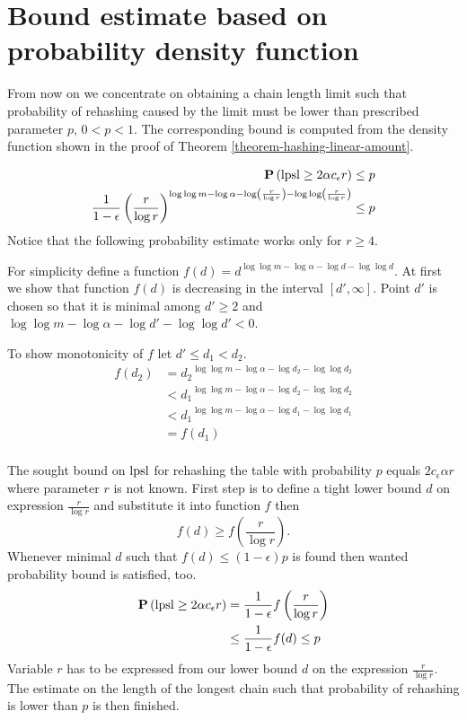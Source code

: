\section{Bound estimate based on probability density function}
\label{section-linear-systems-linear-amount-constant-estimate}
From now on we concentrate on obtaining a chain length limit such that probability of rehashing caused by the limit must be lower than prescribed parameter $p$, $0 < p < 1$. The corresponding bound is computed from the density function shown in the proof of Theorem \ref{theorem-hashing-linear-amount}. 

\[
\begin{split}
\mathbf{P}\left(\mathrm{lpsl} \geq 2\alpha c_\epsilon r\right) & \leq p \\ 
\frac{1}{1 - \epsilon}\left(\frac{r}{\log r}\right)^{\log \log m - \log \alpha - \log \left(\frac{r}{\log r}\right) - \log \log \left(\frac{r}{\log r}\right)} & \leq p \\
\end{split}
\]
Notice that the following probability estimate works only for $r \geq 4$. 

For simplicity define a function $f(d) = d ^ {\log \log m - \log \alpha - \log d - \log \log d}$. At first we show that function $f(d)$ is decreasing in the interval $\left[ d', \infty \right]$. Point $d'$ is chosen so that it is minimal among $d' \geq 2$ and $\log \log m - \log \alpha - \log d' - \log \log d' < 0$. 

To show monotonicity of $f$ let $d' \leq d_1 < d_2$.
\[
\begin{split}
f(d_2) 
	& = {d_2} ^ {\log \log m - \log \alpha - \log d_2 - \log \log d_2} \\
	& < {d_1} ^ {\log \log m - \log \alpha - \log d_2 - \log \log d_2} \\
	& < {d_1} ^ {\log \log m - \log \alpha - \log d_1 - \log \log d_1} \\
	& = f(d_1) \\
\end{split}
\]

The sought bound on $\mathrm{lpsl}$ for rehashing the table with probability $p$ equals $2 c_\epsilon \alpha r$ where parameter $r$ is not known. First step is to define a tight lower bound $d$ on expression $\frac{r}{\log r}$ and substitute it into function $f$ then \[ f(d) \geq f\left(\frac{r}{\log r}\right) \text{.} \] Whenever minimal $d$ such that $f(d) \leq (1 - \epsilon) p$ is found then wanted probability bound is satisfied, too.
\[ 
\begin{split}
\mathbf{P}\left(\mathrm{lpsl} \geq 2 \alpha c_\epsilon r\right) 
	& = \frac{1}{1 - \epsilon} f\left(\frac{r}{\log r}\right) \\
	& \leq \frac{1}{1-\epsilon}f(d) \leq p \\
\end{split}
\]
Variable $r$ has to be expressed from our lower bound $d$ on the expression $\frac{r}{\log r}$. The estimate on the length of the longest chain such that probability of rehashing is lower than $p$ is then finished.

